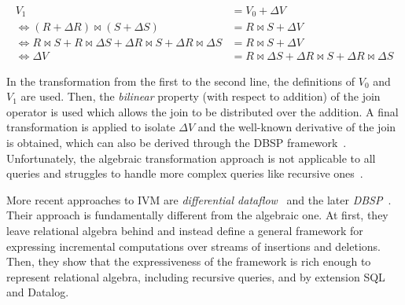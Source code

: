 \begin{equation}
    \begin{aligned}
        V_1                                                                                               & = V_0 + \Delta V                                                      \\
        \Leftrightarrow (R + \Delta R) \bowtie (S + \Delta S)                                             & = R \bowtie S + \Delta V                                              \\
        \Leftrightarrow R \bowtie S + R \bowtie \Delta S + \Delta R \bowtie S + \Delta R \bowtie \Delta S & = R \bowtie S + \Delta V                                              \\
        \Leftrightarrow \Delta V                                                                          & = R \bowtie \Delta S + \Delta R \bowtie S + \Delta R \bowtie \Delta S
    \end{aligned}
\end{equation}

In the transformation from the first to the second line, the definitions
of \(V_0\) and \(V_1\) are used.
Then, the \emph{bilinear} property (with respect to addition) of the join
operator is used which allows the join to be distributed over the addition.
A final transformation is applied to isolate \(\Delta V\) and the well-known
derivative of the join~\cite{idris2017dynamic} is obtained, which can also be
derived through the DBSP framework~\cite{budiu2025dbsp}.
Unfortunately, the algebraic transformation approach is not applicable
to all queries and struggles to handle more complex queries like
recursive ones~\cite{budiu2025dbsp}.

More recent approaches to \ac{IVM} are \emph{differential dataflow}~\cite{mcsherry2013differential}
and the later \emph{DBSP}~\cite{budiu2024dbsp, budiu2025dbsp}.
Their approach is fundamentally different from the algebraic one.
At first, they leave relational algebra behind and instead define a general
framework for expressing incremental computations over streams of insertions
and deletions.
Then, they show that the expressiveness of the framework is rich enough to
represent relational algebra, including recursive queries, and by extension
SQL and Datalog.

